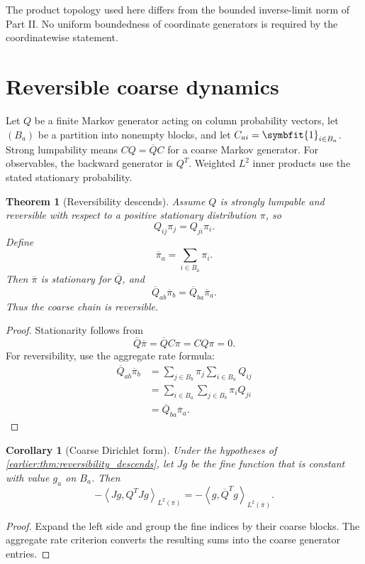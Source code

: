 \documentclass[11pt,letterpaper]{article}
\newtheorem{theorem}{Theorem}[section]
\theoremstyle{plain}
\theoremstyle{plain}
\theoremstyle{plain}
\newtheorem{corollary}[corollary]{Corollary}
\theoremstyle{definition}
\theoremstyle{definition}
\theoremstyle{definition}
\theoremstyle{definition}
\theoremstyle{definition}
\theoremstyle{remark}
\theoremstyle{remark}
\theoremstyle{remark}
\theoremstyle{remark}
\theoremstyle{remark}
\theoremstyle{remark}
\newcommand{\one}{\bm 1}
\newcommand{\ip}[2]{\left\langle#1,#2\right\rangle}
\providecommand{\bm}[1]{\symbfit{#1}}
\begin{document}
The product topology used here differs from the bounded inverse-limit norm of Part II. No uniform boundedness of coordinate generators is required by the coordinatewise statement.
\FloatBarrier
\section{Reversible coarse dynamics}\label{earlier:section:02}
Let $Q$ be a finite Markov generator acting on column probability vectors, let $(B_a)$ be a partition into nonempty blocks, and let $C_{ai}=\one_{i\in B_a}$. Strong lumpability means $CQ=\overline Q C$ for a coarse Markov generator. For observables, the backward generator is $Q^T$. Weighted $L^2$ inner products use the stated stationary probability.
\begin{theorem}[Reversibility descends]\label{earlier:record:009}\label{earlier:thm:reversibility_descends}
Assume \(Q\) is strongly lumpable and reversible with respect to a positive stationary distribution \(\pi\), so
\[
Q_{ij}\pi_j=Q_{ji}\pi_i.
\]
Define
\[
\overline\pi_a=\sum_{i\in B_a}\pi_i.
\]
Then \(\overline\pi\) is stationary for \(\overline Q\), and
\[
\overline Q_{ab}\overline\pi_b
=
\overline Q_{ba}\overline\pi_a.
\]
Thus the coarse chain is reversible.
\end{theorem}

\begin{proof}
Stationarity follows from
\[
\overline Q\overline\pi
=\overline QC\pi
=CQ\pi=0.
\]
For reversibility, use the aggregate rate formula:
\[
\begin{aligned}
\overline Q_{ab}\overline\pi_b
&=\sum_{j\in B_b}\pi_j\sum_{i\in B_a}Q_{ij}\\
&=\sum_{i\in B_a}\sum_{j\in B_b}\pi_iQ_{ji}\\
&=\overline Q_{ba}\overline\pi_a.
\end{aligned}
\]
\end{proof}

\begin{corollary}[Coarse Dirichlet form]\label{earlier:record:010}\label{earlier:cor:coarse_dirichlet_form}
Under the hypotheses of \cref{earlier:thm:reversibility_descends}, let \(Jg\) be the fine function that is constant with value \(g_a\) on \(B_a\). Then
\[
-\ip{Jg}{Q^TJg}_{L^2(\pi)}
=
-\ip{g}{\overline Q^Tg}_{L^2(\overline\pi)}.
\]
\end{corollary}

\begin{proof}
Expand the left side and group the fine indices by their coarse blocks. The aggregate rate criterion converts the resulting sums into the coarse generator entries.
\end{proof}
\end{document}
